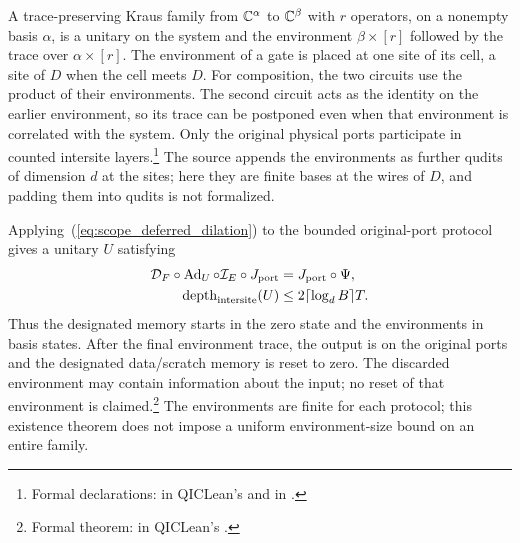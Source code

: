 \documentclass{article}
\begin{document}
A trace-preserving Kraus family from $\mathbb{C}^\alpha$ to $\mathbb{C}^\beta$ with $r$
operators, on a nonempty basis $\alpha$, is a unitary on the system and the
environment $\beta\times[r]$ followed by the trace over $\alpha\times[r]$.
The environment of a gate is placed at one site of its cell, a site of $D$
when the cell meets $D$. For composition, the two circuits use the product
of their environments. The second circuit acts as the identity on the earlier
environment, so its trace can be postponed even when that environment is
correlated with the system. Only the original physical ports participate in
counted intersite layers.\footnote{Formal declarations:
     in QICLean's
     and
     in
    .}
The source appends the environments as further qudits of dimension $d$ at
the sites; here they are finite bases at the wires of $D$, and padding them
into qudits is not formalized.

Applying~(\ref{eq:scope_deferred_dilation}) to the bounded original-port
protocol gives a unitary $U$ satisfying
\begin{align}
    \mathcal D_F\circ\operatorname{Ad}_U\circ\mathcal I_E\circ J_{\mathrm{port}}
                                                 & =J_{\mathrm{port}}\circ\Psi,\label{eq:scope_unitary_port_io} \\
    \operatorname{depth}_{\mathrm{intersite}}(U) & \leq2\lceil\log_d B\rceil T.
    \notag
\end{align}
Thus the designated memory starts in the zero state and the environments in
basis states. After the final environment trace, the output is on the
original ports and the designated data/scratch memory is reset to zero. The
discarded environment may contain information about the input; no reset of
that environment is claimed.\footnote{Formal theorem:
     in QICLean's
    .}
The environments are finite for each protocol; this existence theorem does
not impose a uniform environment-size bound on an entire family.
\end{document}
